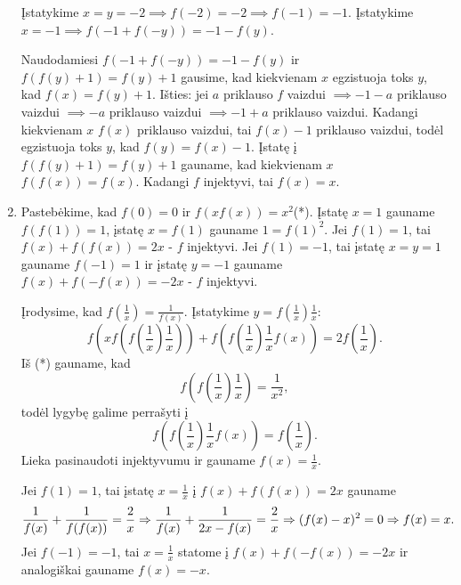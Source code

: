 \begin{enumerate}
    Įstatykime $x=y=-2 \implies f(-2)=-2 \implies f(-1)=-1$.
    Įstatykime $x=-1 \implies f(-1+f(-y))=-1-f(y)$.
    
    Naudodamiesi $f(-1+f(-y))=-1-f(y)$ ir $f(f(y)+1)=f(y)+1$ gausime, kad
    kiekvienam $x$ egzistuoja toks $y$, kad $f(x)=f(y)+1$. Išties: jei
    $a$ priklauso $f$ vaizdui $\implies -1 -a$ priklauso vaizdui
    $\implies -a$ priklauso vaizdui $\implies -1 + a$ priklauso
    vaizdui. Kadangi kiekvienam $x$ $f(x)$ priklauso vaizdui, tai $f(x)-1$
    priklauso vaizdui, todėl egzistuoja toks $y$, kad $f(y)=f(x)-1$.
    Įstatę į $f(f(y)+1)=f(y)+1$ gauname, kad kiekvienam $x$
    $f(f(x))=f(x)$. Kadangi $f$ injektyvi, tai $f(x)=x$.
\item
    Pastebėkime, kad $f(0)=0$ ir $f(xf(x))=x^2$(*). Įstatę $x=1$ gauname
    $f(f(1))=1$, įstatę $x=f(1)$ gauname $1=f(1)^2$. Jei $f(1)=1$, tai
    $f(x)+f(f(x))=2x$ - $f$ injektyvi. Jei $f(1)=-1$, tai įstatę $x=y=1$
    gauname $f(-1)=1$ ir įstatę $y=-1$ gauname $f(x)+f(-f(x))=-2x$ - $f$
    injektyvi.
    
    Įrodysime, kad $f(\frac{1}{x})= \frac{1}{f(x)}$. Įstatykime
    $y=f(\frac{1}{x})\frac{1}{x}$: $$f(xf(f(\frac{1}{x})\frac{1}{x}))+
    f(f(\frac{1}{x})\frac{1}{x}f(x))=2f(\frac{1}{x}).$$
    Iš (*) gauname, kad $$f(f(\frac{1}{x})\frac{1}{x}) = \frac{1}{x^2},$$
    todėl lygybę galime perrašyti į
    $$f(f(\frac{1}{x})\frac{1}{x}f(x))=f(\frac{1}{x}).$$ Lieka pasinaudoti
    injektyvumu ir gauname $f(x)=\frac{1}{x}$.
    
    Jei $f(1)=1$, tai įstatę $x=\frac{1}{x}$ į $f(x)+f(f(x))=2x$ gauname
    $$\frac{1}{f(x)} + \frac{1}{f(f(x))}= \frac{2}{x} \Rightarrow \\
    \frac{1}{f(x)} + \frac{1}{2x - f(x)}= \frac{2}{x} \\ \Rightarrow
    (f(x)-x)^2=0 \Rightarrow f(x)=x.$$
    Jei $f(-1)=-1$, tai $x = \frac{1}{x}$ statome į $f(x)+f(-f(x))=-2x$ ir
    analogiškai gauname $f(x) = -x$.
\end{enumerate} 
